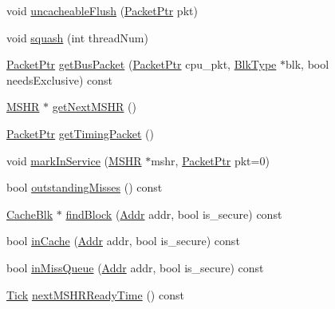 \begin{DoxyCompactItemize}
void \hyperlink{classCache_af5dfa0f9fd3542f24b728e25a1d658b2}{uncacheableFlush} (\hyperlink{classPacket}{PacketPtr} pkt)
\item 
void \hyperlink{classCache_a94c2c174856cbab1e3478cb02ae8ed80}{squash} (int threadNum)
\item 
\hyperlink{classPacket}{PacketPtr} \hyperlink{classCache_a3bdcf30020fcb7b18e1d1f95cc86648e}{getBusPacket} (\hyperlink{classPacket}{PacketPtr} cpu\_\-pkt, \hyperlink{classCache_a10db52a1c10bfd238e0e3d37c4560495}{BlkType} $\ast$blk, bool needsExclusive) const 
\item 
\hyperlink{classMSHR}{MSHR} $\ast$ \hyperlink{classCache_a3ce02537ee4a8918300802fda9b82b47}{getNextMSHR} ()
\item 
\hyperlink{classPacket}{PacketPtr} \hyperlink{classCache_a52bd0127c43c9167c1d092fc060cc472}{getTimingPacket} ()
\item 
void \hyperlink{classCache_ac7fb6ca824d25de54878584fd9dd8162}{markInService} (\hyperlink{classMSHR}{MSHR} $\ast$mshr, \hyperlink{classPacket}{PacketPtr} pkt=0)
\item 
bool \hyperlink{classCache_ac40e843a35136aebfb61fc0c9f57aa27}{outstandingMisses} () const 
\item 
\hyperlink{classCacheBlk}{CacheBlk} $\ast$ \hyperlink{classCache_a4789f9031d3220604c62c0e31a94c539}{findBlock} (\hyperlink{base_2types_8hh_af1bb03d6a4ee096394a6749f0a169232}{Addr} addr, bool is\_\-secure) const 
\item 
bool \hyperlink{classCache_a2a9a72a19c7910262542bc96de2488fb}{inCache} (\hyperlink{base_2types_8hh_af1bb03d6a4ee096394a6749f0a169232}{Addr} addr, bool is\_\-secure) const 
\item 
bool \hyperlink{classCache_a01f08168ad1a2fee8ccff0f562da70de}{inMissQueue} (\hyperlink{base_2types_8hh_af1bb03d6a4ee096394a6749f0a169232}{Addr} addr, bool is\_\-secure) const 
\item 
\hyperlink{base_2types_8hh_a5c8ed81b7d238c9083e1037ba6d61643}{Tick} \hyperlink{classCache_a4601a57ba7740776052541f212c29cbd}{nextMSHRReadyTime} () const 
\end{DoxyCompactItemize}
